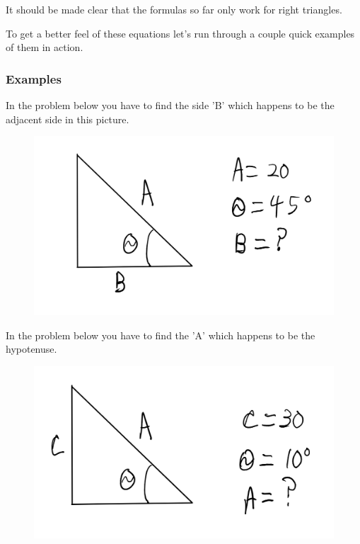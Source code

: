 \documentclass[12pt]{article}
\begin{document}
It should be made clear that the formulas so far only work for right triangles.

To get a better feel of these equations let's run through a couple quick examples of them in action.

\subsubsection{Examples}

In the problem below you have to find the side 'B' which happens to be the adjacent side in this picture.
\begin{figure}[h]
\includegraphics[scale=0.20]{Trigprob1.png}
\end{figure}


\parbox[][12cm][t]{8cm}{}

In the problem below you have to find the 'A' which happens to be the hypotenuse.
\begin{figure}[h]
\includegraphics[scale=0.20]{TrigProb2.png}
\end{figure}
\end{document}
